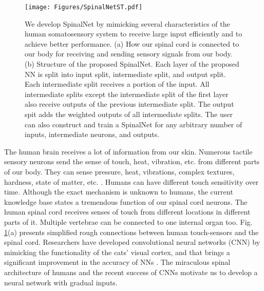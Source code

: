 \documentclass[journal]{IEEEtran}
\begin{document}
\begin{figure}
  \centering
  \texttt{[image: Figures/SpinalNetST.pdf]}
  \caption{We develop SpinalNet by mimicking several characteristics of the human somatosensory system to receive large input efficiently and to achieve better performance. (a) How our spinal cord is connected to our body for receiving and sending sensory signals from our body. (b) Structure of the proposed SpinalNet. Each layer of the proposed NN is split into input split, intermediate split, and output split. Each intermediate split receives a portion of the input. All intermediate splits except the intermediate split of the first layer also receive outputs of the previous intermediate split. The output spit adds the weighted outputs of all intermediate splits. The user can also construct and train a SpinalNet for any arbitrary number of inputs, intermediate neurons, and outputs.   }
  \label{Human_SN}
\end{figure}

The human brain receives a lot of information from our skin. Numerous tactile sensory neurons send the sense of touch, heat, vibration, etc. from different parts of our body. They can sense pressure, heat, vibrations, complex textures, hardness, state of matter, etc. \cite{okamoto2012psychophysical}. Humans can have different touch sensitivity over time. Although the exact mechanism is unknown to humans, the current knowledge base states a tremendous function of our spinal cord neurons. The human spinal cord receives senses of touch from different locations in different parts of it. Multiple vertebrae can be connected to one internal organ too. Fig. \ref{Human_SN}(a) presents simplified rough connections between human touch-sensors and the spinal cord.  Researchers have developed convolutional neural networks (CNN) by mimicking the functionality of the cats' visual cortex, and that brings a significant improvement in the accuracy of NNs \cite{hubel1962receptive}. The miraculous spinal architecture of humans and the recent success of CNNs motivate us to develop a neural network with gradual inputs.  
\end{document}
